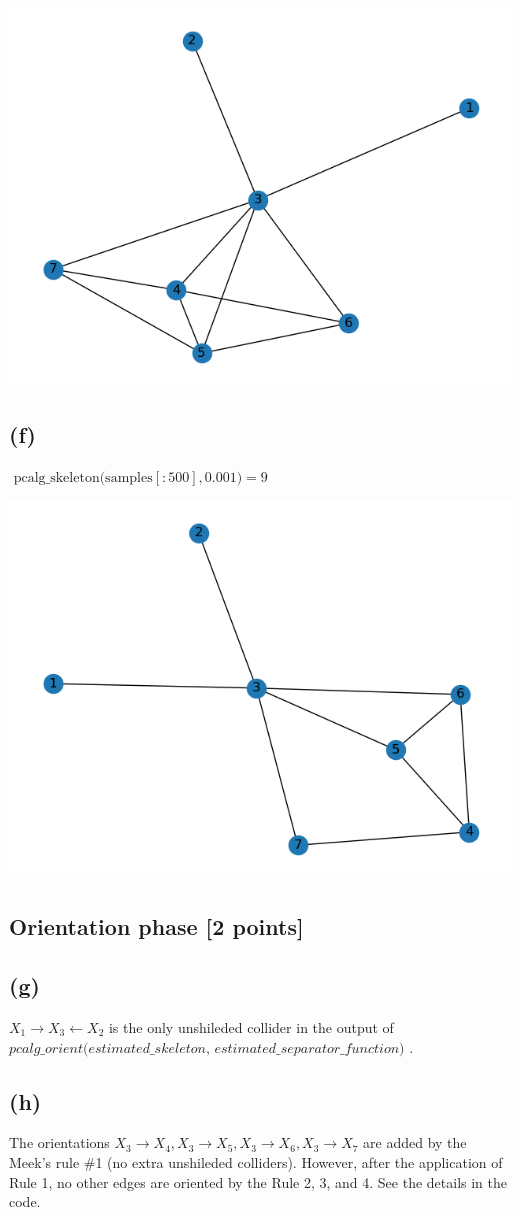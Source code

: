 \documentclass[10pt]{article}
\begin{document}
\includegraphics{images/skel_0.2.png}

\subsection*{(f)}
$\text { pcalg\_skeleton(samples}[: 500], 0.001) = 9$

\includegraphics{images/skel_0.001.png}

\subsection{Orientation phase [2 points]}
\subsection*{(g)}
$X_1 \rightarrow X_3 \leftarrow X_2$ is the only unshileded collider in the output of $\textit{pcalg\_orient(estimated\_skeleton, estimated\_separator\_function) }$. 

\subsection*{(h)}

The orientations $X_3 \rightarrow X_4, X_3 \rightarrow X_5, X_3 \rightarrow X_6, X_3 \rightarrow X_7$ are added by the Meek's rule \#1 (no extra unshileded colliders).
However, after the application of Rule 1, no other edges are oriented by the Rule 2, 3, and 4. See the details in the code.
\end{document}
